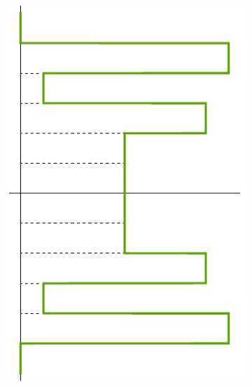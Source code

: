 \documentclass[a4paper,num-refs]{oup-contemporary}
\begin{document}
\begin{figure}[bt!]
\begin{subfigure}{0.25\linewidth}
		\includegraphics[width=\textwidth]{Q.pdf}
		\caption{}
	\end{subfigure}\hspace{0.1\linewidth}
	\begin{subfigure}{0.25\linewidth}

\end{subfigure}
\end{figure}
\end{document}
